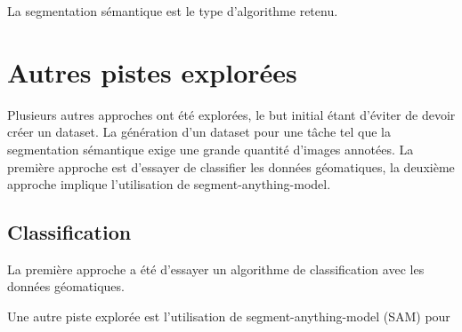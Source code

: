 La segmentation sémantique est le type d'algorithme retenu.

\section{Autres pistes explorées}
Plusieurs autres approches ont été explorées, le but initial étant d'éviter de devoir créer un dataset. La génération d'un dataset pour une tâche tel que la segmentation sémantique exige une grande quantité d'images annotées. La première approche est d'essayer de classifier les données géomatiques, la deuxième approche implique l'utilisation de segment-anything-model.

\subsection{Classification}
La première approche a été d'essayer un algorithme de classification avec les données géomatiques.

Une autre piste explorée est l'utilisation de segment-anything-model (SAM) pour 

